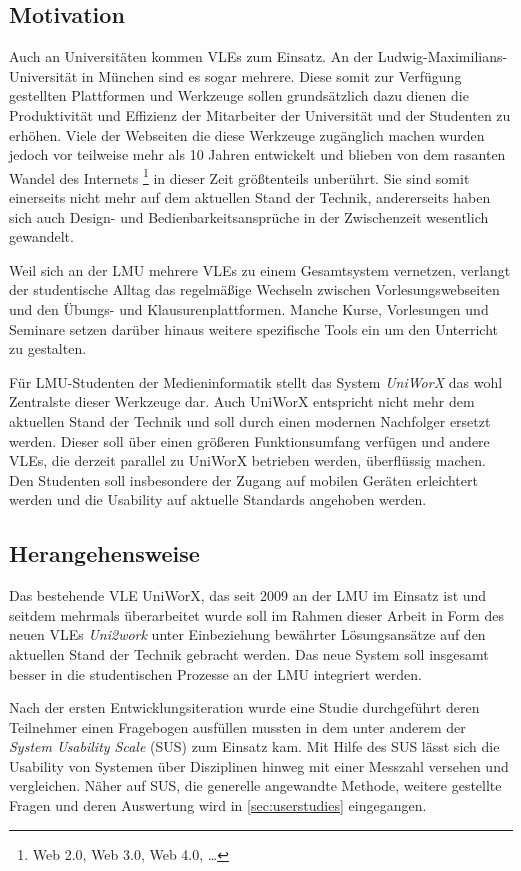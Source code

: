 \documentclass[11pt,a4paper,twoside,ngerman]{article}
\begin{document}
\subsection{Motivation}
Auch an Universitäten kommen VLEs zum Einsatz. An der Ludwig-Maximilians-Universität in München sind es sogar mehrere. Diese somit zur Verfügung gestellten Plattformen und Werkzeuge sollen grundsätzlich dazu dienen die Produktivität und Effizienz der Mitarbeiter der Universität und der Studenten zu erhöhen. Viele der Webseiten die diese Werkzeuge zugänglich machen wurden jedoch vor teilweise mehr als 10 Jahren entwickelt und blieben von dem rasanten Wandel des Internets \footnote{Web 2.0, Web 3.0, Web 4.0, \ldots} in dieser Zeit größtenteils unberührt. Sie sind somit einerseits nicht mehr auf dem aktuellen Stand der Technik, andererseits haben sich auch Design- und Bedienbarkeitsansprüche in der Zwischenzeit wesentlich gewandelt.

Weil sich an der LMU mehrere VLEs zu einem Gesamtsystem vernetzen, verlangt der studentische Alltag das regelmäßige Wechseln zwischen Vorlesungswebseiten und den Übungs- und Klausurenplattformen. Manche Kurse, Vorlesungen und Seminare setzen darüber hinaus weitere spezifische Tools ein um den Unterricht zu gestalten.

Für LMU-Studenten der Medieninformatik stellt das System \textit{UniWorX} das wohl Zentralste dieser Werkzeuge dar. Auch UniWorX entspricht nicht mehr dem aktuellen Stand der Technik und soll durch einen modernen Nachfolger ersetzt werden. Dieser soll über einen größeren Funktionsumfang verfügen und andere VLEs, die derzeit parallel zu UniWorX betrieben werden, überflüssig machen. Den Studenten soll insbesondere der Zugang auf mobilen Geräten erleichtert werden und die Usability auf aktuelle Standards angehoben werden.

\subsection{Herangehensweise}
Das bestehende VLE UniWorX, das seit 2009 an der LMU im Einsatz ist und seitdem mehrmals überarbeitet wurde \cite{web:pstifiuniworx}\cite{web:uniworxchangelog} soll im Rahmen dieser Arbeit in Form des neuen VLEs \textit{Uni2work} unter Einbeziehung bewährter Lösungsansätze auf den aktuellen Stand der Technik gebracht werden. Das neue System soll insgesamt besser in die studentischen Prozesse an der LMU integriert werden.

Nach der ersten Entwicklungsiteration wurde eine Studie durchgeführt deren Teilnehmer einen Fragebogen ausfüllen mussten in dem unter anderem der \textit{System Usability Scale} (SUS) zum Einsatz kam. Mit Hilfe des SUS lässt sich die Usability von Systemen über Disziplinen hinweg mit einer Messzahl versehen und vergleichen. Näher auf SUS, die generelle angewandte Methode, weitere gestellte Fragen und deren Auswertung wird in \autoref{sec:userstudies} eingegangen.
\end{document}
